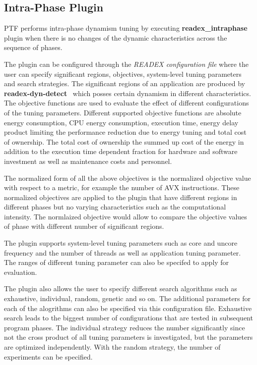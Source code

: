 \subsection{Intra-Phase Plugin} \label{sec:intra-phase}

PTF performs intra-phase dynamism tuning by executing \textbf{readex\_intraphase} plugin when there is no changes of the dynamic characteristics across the sequence of phases.

The plugin can be configured through the \textit{READEX configuration file} where the user can specify significant regions, objectives, system-level tuning parameters and search strategies. The significant regions of an application are produced by \textbf{readex-dyn-detect}~\cite{kumaraswamy2018design} which posses certain dynamism in different characteristics. The objective functions are used to evaluate the effect of different configurations of the tuning parameters. Different supported objective functions are absolute energy consumption, CPU energy consumption, execution time, energy delay product limiting the performance reduction due to energy tuning and total cost of ownership.  The total cost of ownership the summed up cost of the energy in addition to the execution time dependent fraction for hardware and software investment as well as maintenance costs and personnel. 

The normalized form of all the above objectives is the normalized objective value with respect to a metric, for example the number of AVX instructions. These normalized objectives are applied to the plugin that have different regions in different phases but no varying characteristics such as the computational intensity. The normlaized objective would allow to compare the objective values of phase with different number of significant regions. 

The plugin supports system-level tuning parameters such as core and uncore frequency and the number of threads as well as application tuning parameter. The ranges of different tuning parameter can also be specifed to apply for evaluation.

The plugin also allows the user to specify different search algorithms such as exhaustive, individual, random, genetic and so on. The additional parameters for each of the alogrithms can also be specified via this configuration file. 
Exhaustive search leads to the biggest number of configurations that are tested in subsequent program phases. The individual strategy reduces the number significantly since not the cross product of all tuning parameters is investigated, but the parameters are optimized independently. With the random strategy, the number of experiments can be specified. 

